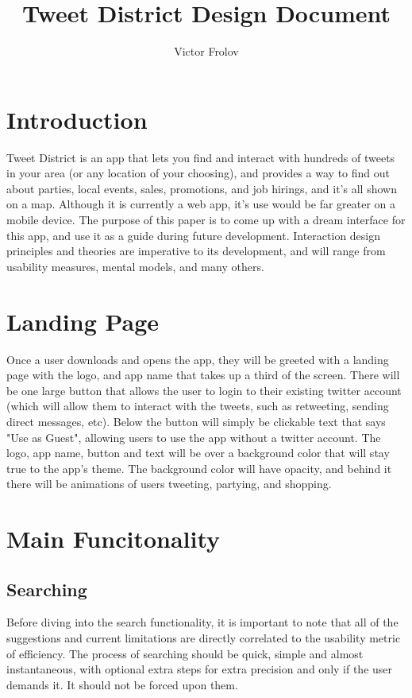 \documentclass[11pt]{article}
\title{Tweet District Design Document}
\author{Victor Frolov}
\begin{document}
\maketitle

\section{Introduction}
Tweet District is an app that lets you find and interact with hundreds of tweets in your area (or any location of your choosing), and provides a way to find out about parties, local events, sales, promotions, and job hirings, and it's all shown on a map. Although it is currently a web app, it's use would be far greater on a mobile device. The purpose of this paper is to come up with a dream interface for this app, and use it as a guide during future development. Interaction design principles and theories are imperative to its development, and will range from usability measures, mental models, and many others.


\section{Landing Page}
Once a user downloads and opens the app, they will be greeted with a landing page with the logo, and app name that takes up a third of the screen. There will be one large button that allows the user to login to their existing twitter account (which will allow them to interact with the tweets, such as retweeting, sending direct messages, etc). Below the button will simply be clickable text that says "Use as Guest", allowing users to use the app without a twitter account. The logo, app name, button and text will be over a background color that will stay true to the app's theme. The background color will have opacity, and behind it there will be animations of users tweeting, partying, and shopping. 




\section{Main Funcitonality}

\subsection{Searching}
Before diving into the search functionality, it is important to note that all of the suggestions and current limitations are directly correlated to the usability metric of efficiency. The process of searching should be quick, simple and almost instantaneous, with optional extra steps for extra precision and only if the user demands it. It should not be forced upon them.
\end{document}
